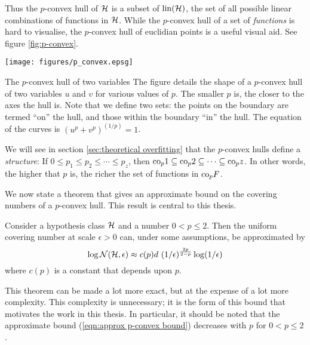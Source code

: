 Thus the $p$-convex hull of $\mathcal{H}$ is a subset of $\mathrm{lin}(\mathcal{H})$, the
set of all possible linear combinations of functions in $\mathcal{H}$.
While the $p$-convex hull of a set of \emph{functions} is hard to
visualise, the $p$-convex hull of euclidian points is a useful visual
aid.  See figure \ref{fig:p-convex}.

\begin{linefigure}
\begin{center}
\texttt{[image: figures/p\_convex.epsg]}
\end{center}
\begin{capt}{The $p$-convex hull of two variables}
The figure details the shape of a $p$-convex hull of two variables $u$
and $v$ for various values of $p$.  The smaller $p$ is, the closer to
the axes the hull is.  Note that we define two sets: the points on the
boundary are termed ``on'' the hull, and those within the boundary
``in'' the hull.  The equation of the curves is $\left( u^p + v^p
\right) ^{(1/p)} = 1$.
\end{capt}
\end{linefigure}

We will see in section \ref{sec:theoretical overfitting} that the
$p$-convex hulls define a \emph{structure}:  If $0 \leq p_1 \leq p_2
\leq \cdots \leq p_z$, then $\mathrm{co}_p 1 \subseteq \mathrm{co}_p 2 \subseteq \cdots
\subseteq \mathrm{co}_p z$.  In other words, the higher that $p$ is, the richer
the set of functions in $\mathrm{co}_p{F}$.

We now state a theorem that gives an approximate bound on the covering
numbers of a $p$-convex hull.  This result is central to this thesis.

\begin{theorem}
Consider a hypothesis class $\mathcal{H}$ and a number $0 < p \leq 2$.  Then
the uniform covering number at scale $\epsilon > 0$ can, under some
assumptions,  be approximated by
%
\begin{equation}
\label{eqn:approx p-convex bound}
\log \mathcal{N}({\mathcal{H}}, {\epsilon}) \approx c(p) d\ (1 /
\epsilon)^{\frac{2p}{2-p}} \log (1 / \epsilon)
\end{equation}
%
where $c(p)$ is a constant that depends upon $p$.
\end{theorem}

This theorem can be made a lot more exact, but at the expense of a lot
more complexity.  This complexity is unnecessary; it is the form of
this bound that motivates the work in this thesis.  In particular, it
should be noted that the approximate bound (\ref{eqn:approx p-convex
bound}) decreases with $p$ for $0 < p \leq 2$.

